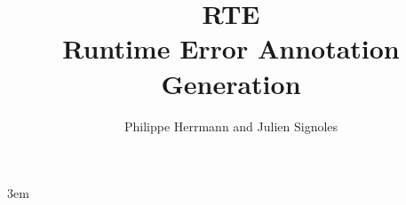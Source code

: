 \documentclass[a4paper,11pt,twoside,openright,web]{frama-c-book}
\title{RTE\\\bigskip Runtime Error Annotation Generation}
\author{Philippe Herrmann and Julien Signoles}
\begin{document}
\sloppy
\emergencystretch 3em

\maketitle


\end{document}
